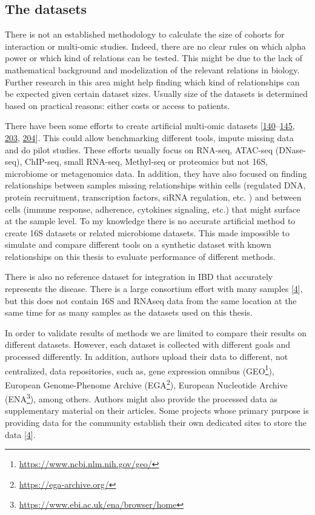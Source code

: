\documentclass[
  12pt,
  a4paper,
  twoside,
  openright]{book}
\DeclareRobustCommand{\href}[2]{#2\footnote{\url{#1}}}
\begin{document}
\hypertarget{discussion-datasets}{%
\subsection{The datasets}\label{discussion-datasets}}

There is not an established methodology to calculate the size of cohorts for interaction or multi-omic studies.
Indeed, there are no clear rules on which alpha power or which kind of relations can be tested.
This might be due to the lack of mathematical background and modelization of the relevant relations in biology.
Further research in this area might help finding which kind of relationships can be expected given certain dataset sizes.
Usually size of the datasets is determined based on practical reasons: either costs or access to patients.

There have been some efforts to create artificial multi-omic datasets {[}\protect\hyperlink{ref-martuxednez-mira2018}{140}--\protect\hyperlink{ref-mccarthy2012}{145}, \protect\hyperlink{ref-chalise2016}{203}, \protect\hyperlink{ref-chung2019}{204}{]}.
This could allow benchmarking different tools, impute missing data and do pilot studies.
These efforts usually focus on RNA-seq, ATAC-seq (DNase-seq), ChIP-seq, small RNA-seq, Methyl-seq or proteomics but not 16S, microbiome or metagenomics data.
In addition, they have also focused on finding relationships between samples missing relationships within cells (regulated DNA, protein recruitment, transcription factors, siRNA regulation, etc. ) and between cells (immune response, adherence, cytokines signaling, etc.) that might surface at the sample level.
To my knowledge there is no accurate artificial method to create 16S datasets or related microbiome datasets.
This made impossible to simulate and compare different tools on a synthetic dataset with known relationships on this thesis to evaluate performance of different methods.

There is also no reference dataset for integration in IBD that accurately represents the disease.
There is a large consortium effort with many samples {[}\protect\hyperlink{ref-humanmicrobiomeprojectconsortium2012}{4}{]}, but this does not contain 16S and RNAseq data from the same location at the same time for as many samples as the datasets used on this thesis.

In order to validate results of methods we are limited to compare their results on different datasets.
However, each dataset is collected with different goals and processed differently.
In addition, authors upload their data to different, not centralized, data repositories, such as, gene expression omnibus (\href{https://www.ncbi.nlm.nih.gov/geo/}{GEO}), European Genome-Phenome Archive (\href{https://ega-archive.org/}{EGA}), European Nucleotide Archive (\href{https://www.ebi.ac.uk/ena/browser/home}{ENA}), among others.
Authors might also provide the processed data as supplementary material on their articles.
Some projects whose primary purpose is providing data for the community establish their own dedicated sites to store the data {[}\protect\hyperlink{ref-humanmicrobiomeprojectconsortium2012}{4}{]}.
\end{document}
